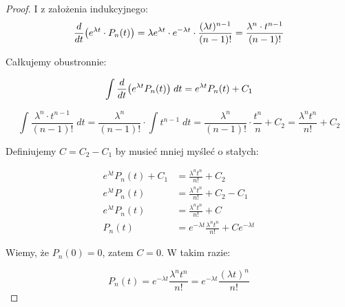 \begin{proof}
    I z założenia indukcyjnego:
    \[
        \frac{d}{dt}\pars{e^{\lambda t}\cdot P_n(t)} = \lambda e^{\lambda t} \cdot e^{-\lambda t} \cdot \frac{(\lambda t)^{n-1}}{(n-1)!} = \frac{\lambda^n \cdot t^{n-1}}{(n-1)!}
    \]
    
    Całkujemy obustronnie: 
    
    \[
        \int \frac{d}{dt}\pars{e^{\lambda t} P_n(t)} \; dt = e^{\lambda t} P_n(t) + C_1
    \]
    
    \[
        \int \frac{\lambda^n \cdot t^{n-1}}{(n-1)!} \; dt = \frac{\lambda^n}{(n-1)!} \cdot \int t^{n-1} \; dt  = 
        \frac{\lambda^n}{(n-1)!} \cdot \frac{t^n}{n} + C_2 = \frac{\lambda^n t^n}{n!} + C_2
    \]
    
    Definiujemy \(C = C_2 - C_1\) by musieć mniej myśleć o stałych:
    
    \begin{align*}
        e^{\lambda t} P_n(t) + C_1 &= \frac{\lambda^n t^n}{n!} + C_2 \\ 
        e^{\lambda t} P_n(t) &= \frac{\lambda^n t^n}{n!} + C_2 - C_1 \\
        e^{\lambda t} P_n(t) &= \frac{\lambda^n t^n}{n!} + C \\ 
        P_n(t) &= e^{-\lambda t} \frac{\lambda^n t^n}{n!} + C e^{-\lambda t}
    \end{align*}
    
    Wiemy, że \( P_n(0) = 0 \), zatem \(C = 0\). W takim razie:
    
    \[
        P_n(t) = e^{-\lambda t} \frac{\lambda^n t^n}{n!} = e^{-\lambda t} \frac{(\lambda t)^n}{n!}
    \]
    
\end{proof}

